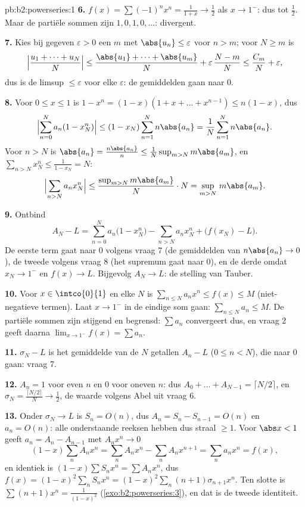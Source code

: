 \begin{solution}{pb:b2:powerseries:1}
\textbf{6.} $f(x) = \sum(-1)^nx^n = \frac{1}{1+x} \to \frac12$ als
$x \to 1^-$: dus  tot $\frac12$. Maar de partiële
sommen zijn $1, 0, 1, 0, \dots$: divergent.

\textbf{7.} Kies bij gegeven $\varepsilon > 0$ een $m$ met
$\abs{u_n} \leq \varepsilon$ voor $n > m$; voor $N \geq m$ is
\[
\Bigl|\frac{u_1 + \dots + u_N}{N}\Bigr|
\leq \frac{\abs{u_1} + \dots + \abs{u_m}}{N} +
\varepsilon\,\frac{N - m}{N}
\leq \frac{C_m}{N} + \varepsilon,
\]
dus is de limsup $\leq \varepsilon$ voor elke $\varepsilon$: de
gemiddelden gaan naar $0$.

\textbf{8.} Voor $0 \leq x \leq 1$ is $1 - x^n = (1-x)(1 + x +
\dots + x^{n-1}) \leq n(1-x)$, dus
\[
\Bigl|\sum_{n=0}^N a_n(1 - x_N^n)\Bigr|
\leq (1 - x_N)\sum_{n=1}^N n\abs{a_n}
= \frac1N\sum_{n=1}^{N}n\abs{a_n} .
\]
Voor $n > N$ is $\abs{a_n} = \frac{n\abs{a_n}}{n} \leq
\frac{1}{N}\sup_{m>N}m\abs{a_m}$, en $\sum_{n>N}x_N^n \leq
\frac{1}{1 - x_N} = N$:
\[
\Bigl|\sum_{n>N}a_nx_N^n\Bigr|
\leq \frac{\sup_{m>N}m\abs{a_m}}{N}\cdot N
= \sup_{m>N}\,m\abs{a_m} .
\]

\textbf{9.} Ontbind
\[
A_N - L = \sum_{n=0}^{N}a_n\bigl(1 - x_N^n\bigr)
- \sum_{n>N}a_nx_N^n + \bigl(f(x_N) - L\bigr) .
\]
De eerste term gaat naar $0$ volgens vraag 7 (de gemiddelden van
$n\abs{a_n} \to 0$), de tweede volgens vraag 8 (het supremum gaat
naar $0$), en de derde omdat $x_N \to 1^-$ en $f(x) \to L$.
Bijgevolg $A_N \to L$: de stelling van Tauber.

\textbf{10.} Voor $x \in \intco{0}{1}$ en elke $N$ is
$\sum_{n\leq N}a_nx^n \leq f(x) \leq M$ (niet-negatieve termen).
Laat $x \to 1^-$ in de eindige som gaan: $\sum_{n\leq N}a_n \leq
M$. De partiële sommen zijn stijgend en begrensd: $\sum a_n$
convergeert dus, en vraag 2 geeft daarna $\lim_{x\to1^-}f(x) = \sum
a_n$.

\textbf{11.} $\sigma_N - L$ is het gemiddelde van de $N$ getallen
$A_n - L$ ($0 \leq n < N$), die naar $0$ gaan: vraag 7.

\textbf{12.} $A_n = 1$ voor even $n$ en $0$ voor oneven $n$: dus
$A_0 + \dots + A_{N-1} = \lceil N/2\rceil$, en $\sigma_N =
\frac{\lceil N/2\rceil}{N} \to \frac12$, de waarde volgens Abel uit
vraag 6.

\textbf{13.} Onder $\sigma_N \to L$ is $S_n = O(n)$, dus $A_n = S_n
- S_{n-1} = O(n)$ en $a_n = O(n)$: alle onderstaande reeksen hebben
dus straal $\geq 1$. Voor $\abs x < 1$ geeft $a_n = A_n - A_{n-1}$
met $A_nx^n \to 0$
\[
(1-x)\sum_n A_nx^n = \sum_n A_nx^n - \sum_n A_nx^{n+1}
= \sum_n a_nx^n = f(x),
\]
en identiek is $(1-x)\sum S_nx^n = \sum A_nx^n$, dus $f(x) =
(1-x)^2\sum_n S_nx^n = (1-x)^2\sum_n(n+1)\sigma_{n+1}x^n$. Ten
slotte is $\sum(n+1)x^n = \frac{1}{(1-x)^2}$
(\cref{exo:b2:powerseries:3}), en dat is de tweede identiteit.


\end{solution}
